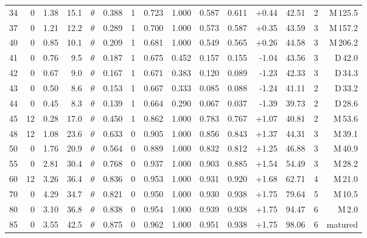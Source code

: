 \documentclass[conference]{IEEEtran}
\begin{document}
\begin{table}[t]
\begin{tabular}{@{}r|rrr|lrcrr|rrr|rrr@{}}
34 & 0 & 1.38 & 15.1 & $\theta$ & 0.388 & 1 & 0.723 & 1.000 & 0.587 & 0.611 & +0.44 & 42.51 & 2 & M\,125.5 \\
37 & 0 & 1.21 & 12.2 & $\theta$ & 0.289 & 1 & 0.700 & 1.000 & 0.573 & 0.587 & +0.35 & 43.59 & 3 & M\,157.2 \\
40 & 0 & 0.85 & 10.1 & $\theta$ & 0.209 & 1 & 0.681 & 1.000 & 0.549 & 0.565 & +0.26 & 44.58 & 3 & M\,206.2 \\
\rowcolor{cEvent!15}41 & 0 & 0.76 & 9.5 & $\theta$ & 0.187 & 1 & 0.675 & 0.452 & 0.157 & 0.155 & -1.04 & 43.56 & 3 & D\,42.0 \\
42 & 0 & 0.67 & 9.0 & $\theta$ & 0.167 & 1 & 0.671 & 0.383 & 0.120 & 0.089 & -1.23 & 42.33 & 3 & D\,34.3 \\
43 & 0 & 0.50 & 8.6 & $\theta$ & 0.153 & 1 & 0.667 & 0.333 & 0.085 & 0.088 & -1.24 & 41.11 & 2 & D\,33.2 \\
44 & 0 & 0.45 & 8.3 & $\theta$ & 0.139 & 1 & 0.664 & 0.290 & 0.067 & 0.037 & -1.39 & 39.73 & 2 & D\,28.6 \\
\rowcolor{cEvent!15}45 & 12 & 0.28 & 17.0 & $\theta$ & 0.450 & 1 & 0.862 & 1.000 & 0.783 & 0.767 & +1.07 & 40.81 & 2 & M\,53.6 \\
48 & 12 & 1.08 & 23.6 & $\theta$ & 0.633 & 0 & 0.905 & 1.000 & 0.856 & 0.843 & +1.37 & 44.31 & 3 & M\,39.1 \\
50 & 0 & 1.76 & 20.9 & $\theta$ & 0.564 & 0 & 0.889 & 1.000 & 0.832 & 0.812 & +1.25 & 46.88 & 3 & M\,40.9 \\
55 & 0 & 2.81 & 30.4 & $\theta$ & 0.768 & 0 & 0.937 & 1.000 & 0.903 & 0.885 & +1.54 & 54.49 & 3 & M\,28.2 \\
60 & 12 & 3.26 & 36.4 & $\theta$ & 0.836 & 0 & 0.953 & 1.000 & 0.931 & 0.920 & +1.68 & 62.71 & 4 & M\,21.0 \\
70 & 0 & 4.29 & 34.7 & $\theta$ & 0.821 & 0 & 0.950 & 1.000 & 0.930 & 0.938 & +1.75 & 79.64 & 5 & M\,10.5 \\
80 & 0 & 3.10 & 36.8 & $\theta$ & 0.838 & 0 & 0.954 & 1.000 & 0.939 & 0.938 & +1.75 & 94.47 & 6 & M\,2.0 \\
85 & 0 & 3.55 & 42.5 & $\theta$ & 0.875 & 0 & 0.962 & 1.000 & 0.951 & 0.938 & +1.75 & 98.06 & 6 & matured \\
\bottomrule
\end{tabular}
\end{table}
\end{document}
